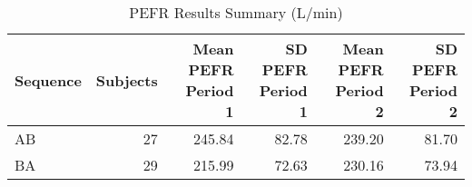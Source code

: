 \begin{table}
\centering
\caption{PEFR Results Summary (L/min)}
\centering
\begin{tabular}[t]{l|r|r|r|r|r}
\hline
Sequence & Subjects & Mean PEFR Period 1 & SD PEFR Period 1 & Mean PEFR Period 2 & SD PEFR Period 2\\
\hline
AB & 27 & 245.84 & 82.78 & 239.20 & 81.70\\
\hline
BA & 29 & 215.99 & 72.63 & 230.16 & 73.94\\
\hline
\end{tabular}
\end{table}
